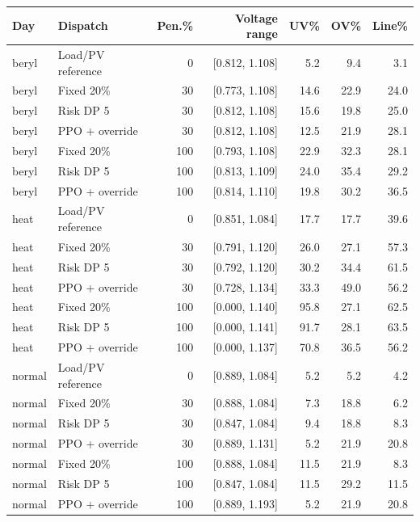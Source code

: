 \begin{tabular}{llrrrrr}
\toprule
Day & Dispatch & Pen.\% & Voltage range & UV\% & OV\% & Line\% \\
\midrule
beryl & Load/PV reference & 0 & [0.812, 1.108] & 5.2 & 9.4 & 3.1 \\
beryl & Fixed 20\% & 30 & [0.773, 1.108] & 14.6 & 22.9 & 24.0 \\
beryl & Risk DP 5 & 30 & [0.812, 1.108] & 15.6 & 19.8 & 25.0 \\
beryl & PPO + override & 30 & [0.812, 1.108] & 12.5 & 21.9 & 28.1 \\
beryl & Fixed 20\% & 100 & [0.793, 1.108] & 22.9 & 32.3 & 28.1 \\
beryl & Risk DP 5 & 100 & [0.813, 1.109] & 24.0 & 35.4 & 29.2 \\
beryl & PPO + override & 100 & [0.814, 1.110] & 19.8 & 30.2 & 36.5 \\
heat & Load/PV reference & 0 & [0.851, 1.084] & 17.7 & 17.7 & 39.6 \\
heat & Fixed 20\% & 30 & [0.791, 1.120] & 26.0 & 27.1 & 57.3 \\
heat & Risk DP 5 & 30 & [0.792, 1.120] & 30.2 & 34.4 & 61.5 \\
heat & PPO + override & 30 & [0.728, 1.134] & 33.3 & 49.0 & 56.2 \\
heat & Fixed 20\% & 100 & [0.000, 1.140] & 95.8 & 27.1 & 62.5 \\
heat & Risk DP 5 & 100 & [0.000, 1.141] & 91.7 & 28.1 & 63.5 \\
heat & PPO + override & 100 & [0.000, 1.137] & 70.8 & 36.5 & 56.2 \\
normal & Load/PV reference & 0 & [0.889, 1.084] & 5.2 & 5.2 & 4.2 \\
normal & Fixed 20\% & 30 & [0.888, 1.084] & 7.3 & 18.8 & 6.2 \\
normal & Risk DP 5 & 30 & [0.847, 1.084] & 9.4 & 18.8 & 8.3 \\
normal & PPO + override & 30 & [0.889, 1.131] & 5.2 & 21.9 & 20.8 \\
normal & Fixed 20\% & 100 & [0.888, 1.084] & 11.5 & 21.9 & 8.3 \\
normal & Risk DP 5 & 100 & [0.847, 1.084] & 11.5 & 29.2 & 11.5 \\
normal & PPO + override & 100 & [0.889, 1.193] & 5.2 & 21.9 & 20.8 \\
\bottomrule
\end{tabular}
